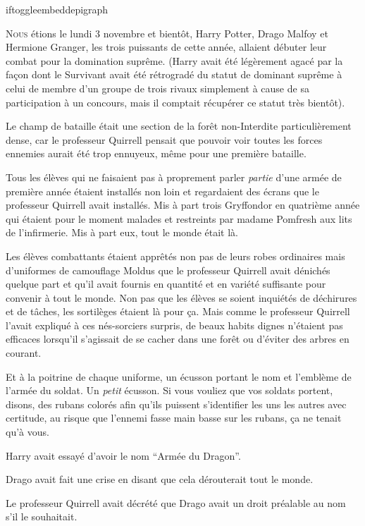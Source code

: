 
iftoggle{embeddepigraph}{}{}

\lettrine{N}{ous} étions le lundi 3 novembre et bientôt, Harry Potter, Drago Malfoy et Hermione Granger, les trois puissants de cette année, allaient débuter leur combat pour la domination suprême.
(Harry avait été légèrement agacé par la façon dont le Survivant avait été rétrogradé du statut de dominant suprême à celui de membre d'un groupe de trois rivaux simplement à cause de sa participation à un concours, mais il comptait récupérer ce statut très bientôt).

Le champ de bataille était une section de la forêt non-Interdite particulièrement dense, car le professeur Quirrell pensait que pouvoir voir toutes les forces ennemies aurait été trop ennuyeux, même pour une première bataille.

Tous les élèves qui ne faisaient pas à proprement parler \emph{partie} d'une armée de première année étaient installés non loin et regardaient des écrans que le professeur Quirrell avait installés. Mis à part trois Gryffondor en quatrième année qui étaient pour le moment malades et restreints par madame Pomfresh aux lits de l'infirmerie. Mis à part eux, tout le monde était là.

Les élèves combattants étaient apprêtés non pas de leurs robes ordinaires mais d'uniformes de camouflage Moldus que le professeur Quirrell avait dénichés quelque part et qu'il avait fournis en quantité et en variété suffisante pour convenir à tout le monde. Non pas que les élèves se soient inquiétés de déchirures et de tâches, les sortilèges étaient là pour ça. Mais comme le professeur Quirrell l'avait expliqué à ces nés-sorciers surpris, de beaux habits dignes n'étaient pas efficaces lorsqu'il s'agissait de se cacher dans une forêt ou d'éviter des arbres en courant.

Et à la poitrine de chaque uniforme, un écusson portant le nom et l'emblème de l'armée du soldat. Un \emph{petit} écusson. Si vous vouliez que vos soldats portent, disons, des rubans colorés afin qu'ils puissent s'identifier les uns les autres avec certitude, au risque que l'ennemi fasse main basse sur les rubans, ça ne tenait qu'à vous.

Harry avait essayé d'avoir le nom “Armée du Dragon”.

Drago avait fait une crise en disant que cela dérouterait tout le monde.

Le professeur Quirrell avait décrété que Drago avait un droit préalable au nom s'il le souhaitait.

